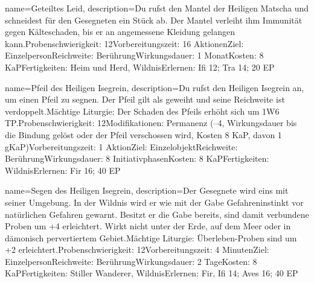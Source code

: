 {
    name={Geteiltes Leid},
    description={Du rufst den Mantel der Heiligen Matscha und schneidest für den Gesegneten ein Stück ab. Der Mantel verleiht ihm Immunität gegen Kälteschaden, bis er an angemessene Kleidung gelangen kann.\newline Probenschwierigkeit: 12\newline Vorbereitungszeit: 16 Aktionen\newline Ziel: Einzelperson\newline Reichweite: Berührung\newline Wirkungsdauer: 1 Monat\newline Kosten: 8 KaP\newline Fertigkeiten: Heim und Herd, Wildnis\newline Erlernen: Ifi 12; Tra 14; 20 EP}
}


{
    name={Pfeil des Heiligen Isegrein},
    description={Du rufst den Heiligen Isegrein an, um einen Pfeil zu segnen. Der Pfeil gilt als geweiht und seine Reichweite ist verdoppelt.\newline Mächtige Liturgie: Der Schaden des Pfeils erhöht sich um 1W6 TP.\newline Probenschwierigkeit: 12\newline Modifikationen: Permanenz (–4, Wirkungsdauer bis die Bindung gelöst oder der Pfeil verschossen wird, Kosten 8 KaP, davon 1 gKaP)\newline Vorbereitungszeit: 1 Aktion\newline Ziel: Einzelobjekt\newline Reichweite: Berührung\newline Wirkungsdauer: 8 Initiativphasen\newline Kosten: 8 KaP\newline Fertigkeiten: Wildnis\newline Erlernen: Fir 16; 40 EP}
}


{
    name={Segen des Heiligen Isegrein},
    description={Der Gesegnete wird eins mit seiner Umgebung. In der Wildnis wird er wie mit der Gabe Gefahreninstinkt vor natürlichen Gefahren gewarnt. Besitzt er die Gabe bereits, sind damit verbundene Proben um +4 erleichtert. Wirkt nicht unter der Erde, auf dem Meer oder in dämonisch pervertiertem Gebiet.\newline Mächtige Liturgie: Überleben-Proben sind um +2 erleichtert.\newline Probenschwierigkeit: 12\newline Vorbereitungszeit: 4 Minuten\newline Ziel: Einzelperson\newline Reichweite: Berührung\newline Wirkungsdauer: 2 Tage\newline Kosten: 8 KaP\newline Fertigkeiten: Stiller Wanderer, Wildnis\newline Erlernen: Fir, Ifi 14; Aves 16; 40 EP}
}


